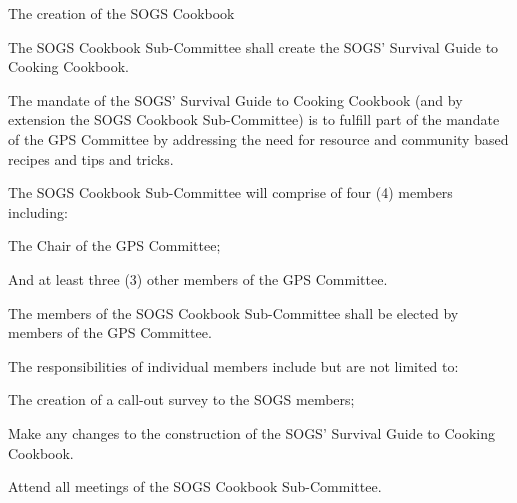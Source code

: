 \begin{longenum}[ label*=\thesubsection.\arabic*., align=left]
\begin{longenum}[label*=\arabic*., align=left]
\begin{longenum}[label*=\arabic*., align=left]
			\end{longenum}				
		\end{longenum}
\item The creation of the SOGS Cookbook
		\begin{longenum}[label*=\arabic*., align=left]
		\item The SOGS Cookbook Sub-Committee shall create the SOGS' Survival Guide to Cooking Cookbook.
		\item The mandate of the SOGS' Survival Guide to Cooking Cookbook (and by extension the SOGS Cookbook Sub-Committee) is to fulfill part of the mandate of the GPS Committee by addressing the need for resource and community based recipes and tips and tricks.
		\item The SOGS Cookbook Sub-Committee will comprise of four (4) members including:
			\begin{longenum}[label*=\arabic*., align=left]		
			\item The Chair of the GPS Committee;
			\item And at least three (3) other members of the GPS Committee.
			\end{longenum}		
		\item The members of the SOGS Cookbook Sub-Committee shall be elected by members of the GPS Committee.
		\item The responsibilities of individual members include but are not limited to:
			\begin{longenum}[label*=\arabic*., align=left]	
			\item The creation of a call-out survey to the SOGS members;
			\item Make any changes to the construction of the SOGS' Survival Guide to Cooking Cookbook.
			\item Attend all meetings of the SOGS Cookbook Sub-Committee.							
			\end{longenum}		
		\end{longenum}
\end{longenum}





















